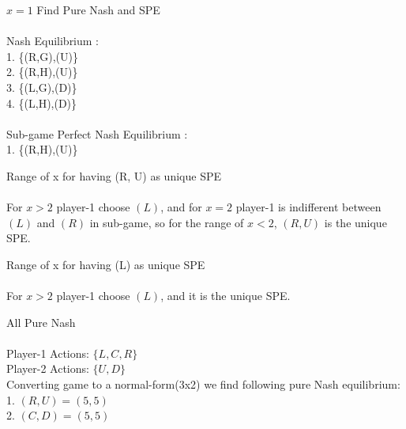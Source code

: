 \documentclass[
  course = {{IE579 Game Theory and Multi-Agent Reinforcement Learning}},
  quartile = {{4}},
  assignment = 2,
  name = {{Mohammad Mahdi Rahimi}},
  studentnumber = {{20208244}},
  email = {{mahi@kaist.ac.kr}},
  firstexercise = 1
]{aga-homework}
\begin{document}
\exercise
\subexercise $x = 1$ Find Pure Nash and SPE
\\\\
Nash Equilibrium :\\
1. \{(R,G),(U)\}\\
2. \{(R,H),(U)\}\\
3. \{(L,G),(D)\}\\
4. \{(L,H),(D)\}\\
\\
Sub-game Perfect Nash Equilibrium :\\
1. \{(R,H),(U)\}

\subexercise Range of x for having (R, U) as unique SPE
\\\\
For $x > 2$ player-1 choose $(L)$, and for $x = 2$ player-1 is indifferent between $(L)$ and $(R)$ in sub-game, so for the range of $x < 2$, $(R, U)$ is the unique SPE.

\subexercise  Range of x for having (L) as unique SPE
\\\\
For $x > 2$ player-1 choose $(L)$, and it is the unique SPE.

\exercise
\subexercise All Pure Nash
\\\\
Player-1 Actions: $\{L, C, R\}$\\
Player-2 Actions: $\{U, D\}$\\
Converting game to a normal-form(3x2) we find following pure Nash equilibrium:\\
1. $(R, U) = (5, 5)$\\
2. $(C, D) = (5, 5)$
\end{document}
